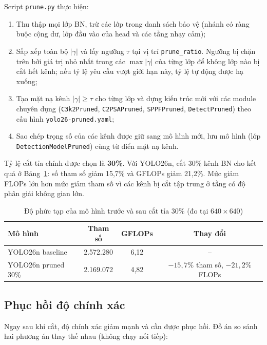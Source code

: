 Script \texttt{prune.py} thực hiện:
\begin{enumerate}
  \item Thu thập mọi lớp BN, trừ các lớp trong danh sách bảo vệ (nhánh có ràng
        buộc cộng dư, lớp đầu vào của head và các tầng nhạy cảm);
  \item Sắp xếp toàn bộ $|\gamma|$ và lấy ngưỡng $\tau$ tại vị trí
        \texttt{prune\_ratio}. Ngưỡng bị chặn trên bởi giá trị nhỏ nhất trong các
        $\max|\gamma|$ của từng lớp để không lớp nào bị cắt hết kênh; nếu tỷ lệ yêu
        cầu vượt giới hạn này, tỷ lệ tự động được hạ xuống;
  \item Tạo mặt nạ kênh $|\gamma| \ge \tau$ cho từng lớp và dựng kiến trúc mới
        với các module chuyên dụng (\texttt{C3k2Pruned}, \texttt{C2PSAPruned},
        \texttt{SPPFPruned}, \texttt{DetectPruned}) theo cấu hình
        \texttt{yolo26-pruned.yaml};
  \item Sao chép trọng số của các kênh được giữ sang mô hình mới, lưu mô hình
        (lớp \texttt{DetectionModelPruned}) cùng từ điển mặt nạ kênh.
\end{enumerate}

Tỷ lệ cắt tỉa chính được chọn là \textbf{30\%}. Với YOLO26n, cắt 30\% kênh BN
cho kết quả ở Bảng~\ref{tab:pruning-complexity}: số tham số giảm 15,7\% và
GFLOPs giảm 21,2\%. Mức giảm FLOPs lớn hơn mức giảm tham số vì các kênh bị cắt
tập trung ở tầng có độ phân giải không gian lớn.

\begin{table}[H]
\centering
\caption{Độ phức tạp của mô hình trước và sau cắt tỉa 30\% (đo tại $640\times640$)}
\label{tab:pruning-complexity}
\begin{tabular}{lccc}
\toprule
\textbf{Mô hình} & \textbf{Tham số} & \textbf{GFLOPs} & \textbf{Thay đổi}\\
\midrule
YOLO26n baseline & 2.572.280 & 6,12 & --\\
YOLO26n pruned 30\% & 2.169.072 & 4,82 & $-15{,}7\%$ tham số, $-21{,}2\%$ FLOPs\\
\bottomrule
\end{tabular}
\end{table}

\subsection{Phục hồi độ chính xác}

Ngay sau khi cắt, độ chính xác giảm mạnh và cần được phục hồi. Đồ án so sánh hai
phương án thay thế nhau (không chạy nối tiếp):

